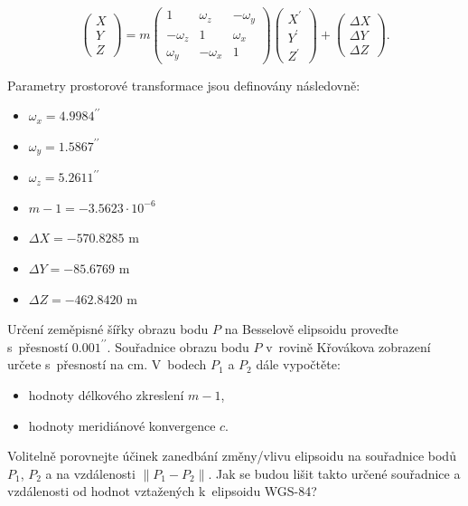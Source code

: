 \documentclass[12pt, a4paper]{article}
\begin{document}
\[
\begin{pmatrix}
X \\
Y \\
Z
\end{pmatrix} 
= m 
\begin{pmatrix}
1 & \omega_{z} & -\omega_{y} \\
-\omega_{z} & 1 & \omega_{x} \\
\omega_{y} & -\omega_{x} & 1
\end{pmatrix}
\begin{pmatrix}
X^{\prime} \\
Y^{\prime} \\
Z^{\prime}
\end{pmatrix}
+ 
\begin{pmatrix}
\Delta X \\
\Delta Y \\
\Delta Z
\end{pmatrix}.
\]

\vspace{3mm}
\noindent Parametry prostorové transformace jsou definovány následovně:
\begin{itemize}
    \item $\omega_{x} = 4.9984^{\prime\prime}$
    \item $\omega_{y} = 1.5867^{\prime\prime}$
    \item $\omega_{z} = 5.2611^{\prime\prime}$
    \item $m - 1 = -3.5623 \cdot 10^{-6}$
    \item $\Delta X = -570.8285 \text{ m}$
    \item $\Delta Y = -85.6769 \text{ m}$
    \item $\Delta Z = -462.8420 \text{ m}$
\end{itemize}
\vspace{3mm}

\noindent Určení zeměpisné šířky obrazu bodu $P$ na Besselově elipsoidu proveďte s~přesností $0.001^{\prime\prime}$. Souřadnice obrazu bodu $P$ v~rovině Křovákova zobrazení určete s~přesností na cm. V~bodech $P_{1}$ a $P_{2}$ dále vypočtěte:
\begin{itemize}
    \item hodnoty délkového zkreslení $m-1$,
    \item hodnoty meridiánové konvergence $c$.
\end{itemize}
\vspace{3mm}

\noindent Volitelně porovnejte účinek zanedbání změny/vlivu elipsoidu na souřadnice bodů $P_{1}$, $P_{2}$ a na vzdálenosti $\lVert P_{1}-P_{2} \rVert$. Jak se budou lišit takto určené souřadnice a vzdálenosti od hodnot vztažených k~elipsoidu WGS-84?
\vspace{3mm}
\end{document}
